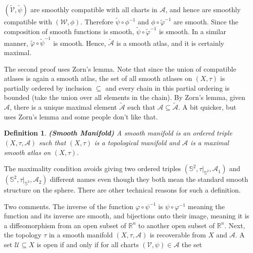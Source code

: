 \documentclass{article}
\theoremstyle{plain}
\theoremstyle{normal}
\newtheorem{definition}{Definition}[section]
\begin{document}
        $(\tilde{\mathcal{V}},\tilde{\psi})$ are smoothly compatible with all
        charts in $\mathcal{A}$, and hence are smoothly compatible with
        $(\mathcal{W},\phi)$. Therefore
        $\tilde{\psi}\circ\phi^{-1}$ and $\phi\circ\tilde{\varphi}^{-1}$ are
        smooth. Since the composition of smooth functions is smooth,
        $\tilde{\psi}\circ\tilde{\varphi}^{-1}$ is smooth. In a similar manner,
        $\tilde{\varphi}\circ\tilde{\psi}^{-1}$ is smooth. Hence,
        $\tilde{\mathcal{A}}$ is a smooth atlas, and it is certainly maximal.
        \par\hfill\par
        The second proof uses Zorn's lemma. Note that since the union of
        compatible atlases is again a smooth atlas, the set of all smooth
        atlases on $(X,\tau)$ is partially ordered by inclusion $\subseteq$
        and every chain in this partial ordering is bounded (take the union
        over all elements in the chain). By Zorn's lemma, given $\mathcal{A}$,
        there is a unique maximal element $\tilde{\mathcal{A}}$ such that
        $\mathcal{A}\subseteq\tilde{\mathcal{A}}$. A bit quicker, but uses
        Zorn's lemma and some people don't like that.
        \begin{definition}{\textbf{(Smooth Manifold)}}
            A smooth manifold is an ordered triple $(X,\tau,\mathcal{A})$
            such that $(X,\tau)$ is a topological manifold and $\mathcal{A}$
            is a maximal smooth atlas on $(X,\tau)$.
        \end{definition}
        The maximality condition avoids giving two ordered triples
        $(\mathbb{S}^{2},\tau|_{\mathbb{S}^{2}},\mathcal{A}_{1})$ and
        $(\mathbb{S}^{2},\tau|_{\mathbb{S}^{2}},\mathcal{A}_{2})$ different
        names even though they both mean the standard smooth structure on the
        sphere. There are other technical reasons for such a definition.
        \par\hfill\par
        Two comments. The inverse of the function $\varphi\circ\psi^{-1}$
        is $\psi\circ\varphi^{-1}$ meaning the function and its inverse are
        smooth, and bijections onto their image, meaning it is a
        diffeomorphism from an open subset of $\mathbb{R}^{n}$ to another open
        subset of $\mathbb{R}^{n}$. Next, the topology $\tau$ in a smooth
        manifold $(X,\tau,\mathcal{A})$ is recoverable from $X$ and
        $\mathcal{A}$. A set $\mathcal{U}\subseteq{X}$ is open if and only if
        for all charts $(\mathcal{V},\psi)\in\mathcal{A}$ the set
\end{document}
